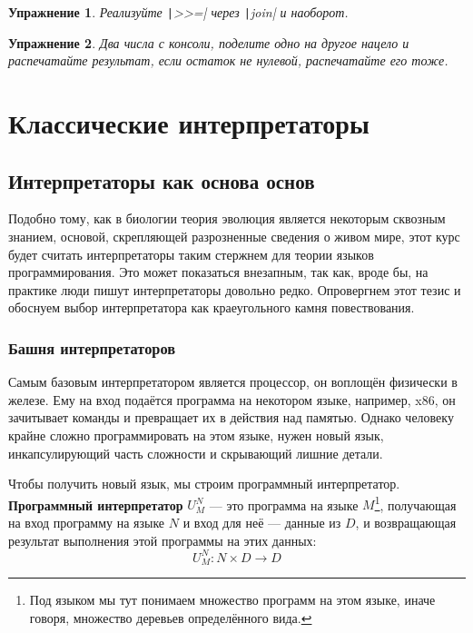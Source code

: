 \documentclass[12pt]{article}
\newcommand{\vocab}[1]{\textbf{#1}} %
\newtheorem{task}{Упражнение}
\begin{document}
    \begin{task}
        Реализуйте \texttt|>>=| через \texttt|join| и наоборот.
    \end{task}

    \begin{task}
        Два числа с консоли, поделите одно на другое нацело и распечатайте результат, если остаток не нулевой, распечатайте его тоже.
    \end{task}


    \section{Классические интерпретаторы}

    \subsection{Интерпретаторы как основа основ}

    Подобно тому, как в биологии теория эволюция является некоторым сквозным знанием, основой, скрепляющей разрозненные сведения о живом мире, этот курс будет считать интерпретаторы таким стержнем для теории языков программирования.
    Это может показаться внезапным, так как, вроде бы, на практике люди пишут интерпретаторы довольно редко.
    Опровергнем этот тезис и обоснуем выбор интерпретатора как краеугольного камня повествования.

    \subsubsection{Башня интерпретаторов}

    Самым базовым интерпретатором является процессор, он воплощён физически в железе.
    Ему на вход подаётся программа на некотором языке, например, x86, он зачитывает команды и превращает их в действия над памятью.
    Однако человеку крайне сложно программировать на этом языке, нужен новый язык, инкапсулирующий часть сложности и скрывающий лишние детали.

    Чтобы получить новый язык, мы строим программный интерпретатор.
    \vocab{Программный интерпретатор} $U_M^N$ --- это программа на языке $M$\footnote{Под языком мы тут понимаем множество программ на этом языке, иначе говоря, множество деревьев определённого вида.}, получающая на вход программу на языке $N$ и вход для неё --- данные из $D$, и возвращающая результат выполнения этой программы на этих данных: \[U_M^N : N\times D\to D\]
\end{document}
